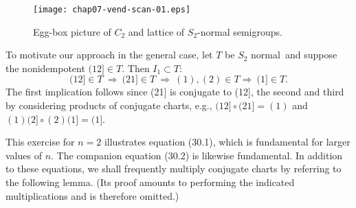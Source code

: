 \documentclass{surv-l}
\numberwithin{equation}{section}
\numberwithin{table}{section}
\numberwithin{figure}{section}
\theoremstyle{plain}
\theoremstyle{definition}
\begin{document}
\begin{figure}[!h]
\texttt{[image: chap07-vend-scan-01.eps]}
\caption{Egg-box picture of $C_{2}$ and lattice of $S_{2}$-normal
semigroups.}\label{fig7.28.1}
\end{figure}

To motivate our approach in the general case, let $T$ be $S_{2}$
normal~and suppose the nonidempotent $(12]\in T$. Then
$I_{1}\subset T$:
\[
(12]\in T\ \Rightarrow\ (21]\in T\ \Rightarrow\ (1), (2) \in T\Rightarrow\ (1]\in T.
\]
The first implication follows since (21] is conjugate to (12], the
second and third by considering products of conjugate charts,
e.g., $(12]\circ (21] =(1)$ and $(1)(2]\circ(2)(1]=(1]$.

This exercise for $n =2$ illustrates equation (30.1), which is
fundamental for larger values of $n$. The companion equation
(30.2) is likewise fundamental. In addition to these equations, we
shall frequently multiply conjugate charts by referring to the
following lemma. (Its proof amounts to performing the indicated
multiplications and is therefore omitted.)
\end{document}
